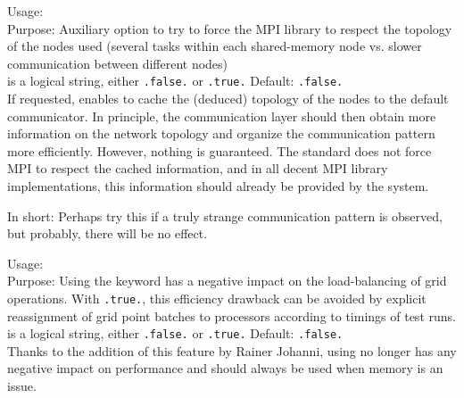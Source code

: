 {
  \noindent
  Usage:   \\[1.0ex]
  Purpose: Auxiliary option to try to force the MPI library to respect
    the topology of the nodes used (several tasks within each
    shared-memory node vs. slower communication between different
    nodes) \\[1.0ex]
   is a logical string, either \texttt{.false.} or
    \texttt{.true.} Default: \texttt{.false.} \\
}
If requested, enables to cache the (deduced) topology of the nodes to
the default communicator. In principle, the communication layer should
then obtain more information on the network topology and organize the
communication pattern more efficiently. However, nothing is
guaranteed. The standard does not force MPI to respect the cached
information, and in all decent MPI library implementations, this
information should already be provided by the system. 

In short: Perhaps try this if a truly strange communication pattern is
observed, but probably, there will be no effect. 


{
  \noindent
  Usage:   \\[1.0ex]
  Purpose: Using the keyword  has a negative impact
  on the load-balancing of grid operations.  With 
  \texttt{.true.}, this efficiency drawback can be avoided by explicit
  reassignment of grid point batches to processors according to timings of
  test runs.
  \\[1.0ex]
   is a logical string, either \texttt{.false.} or
  \texttt{.true.} Default: \texttt{.false.} \\
}
%
Thanks to the addition of this feature by Rainer Johanni, using
 no longer has any negative impact on performance
and should always be used when memory is an issue.

